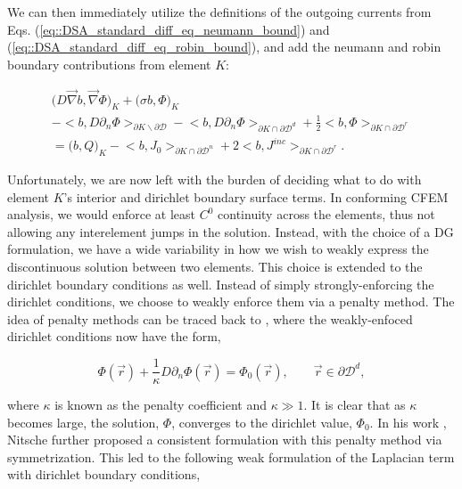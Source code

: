 \noindent We can then immediately utilize the definitions of the outgoing currents from Eqs. (\ref{eq::DSA_standard_diff_eq_neumann_bound}) and (\ref{eq::DSA_standard_diff_eq_robin_bound}), and add the neumann and robin boundary contributions from element $K$:

\begin{equation}
\label{eq::SIP_diff_eq_weak_cellK_NR}
\begin{aligned}
\Big(  D \vec{\nabla}  b , \vec{\nabla} \Phi  \Big)_{K}  + \Big(  \sigma   b ,  \Phi  \Big)_{K}  \\
- \Big<  b, D \partial_n \Phi \Big>_{\partial K \backslash \partial \mathcal{D}} - \Big<  b, D \partial_n \Phi \Big>_{\partial	K \cap \partial \mathcal{D}^d}+ \frac{1}{2} \Big<  b, \Phi  \Big>_{\partial K \cap \partial \mathcal{D}^r} \\
= \Big(  b, Q  \Big)_{K} - \Big<   b, J_{0}  \Big>_{\partial K \cap \partial \mathcal{D}^n} +  2 \Big<  b, J^{inc}  \Big>_{\partial	K \cap \partial \mathcal{D}^r}.
\end{aligned}
\end{equation}

Unfortunately, we are now left with the burden of deciding what to do with element $K$'s interior and dirichlet boundary surface terms. In conforming CFEM analysis, we would enforce at least $C^0$ continuity across the elements, thus not allowing any interelement jumps in the solution. Instead, with the choice of a DG formulation, we have a wide variability in how we wish to weakly express the discontinuous solution between two elements. This choice is extended to the dirichlet boundary conditions as well. Instead of simply strongly-enforcing the dirichlet conditions, we choose to weakly enforce them via a penalty method. The idea of penalty methods can be traced back to \cite{lions2011problemes}, where the weakly-enfoced dirichlet conditions now have the form,

\begin{equation}
\label{eq::penalty_boundary_term}
\Phi (\vec{r}) +\frac{1}{\kappa} D \partial_n \Phi (\vec{r}) = \Phi_0 (\vec{r}), \qquad \vec{r} \in \partial \mathcal{D}^d, 
\end{equation}

\noindent where $\kappa$ is known as the penalty coefficient and $\kappa \gg 1$. It is clear that as $\kappa$ becomes large, the solution, $\Phi$, converges to the dirichlet value, $\Phi_0$. In his work \cite{ref::nitsche_IP}, Nitsche further proposed a consistent formulation with this penalty method via symmetrization. This led to the following weak formulation of the Laplacian term with dirichlet boundary conditions,

